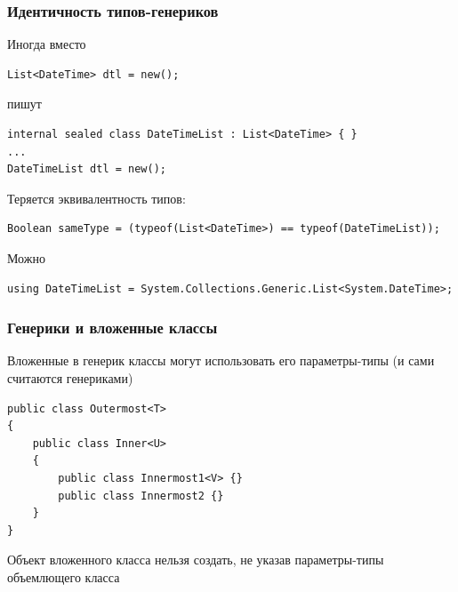 \documentclass{../../slides-style}
\begin{document}
    \begin{frame}[fragile]
        \frametitle{Идентичность типов-генериков}
        Иногда вместо
        \begin{footnotesize}
            \begin{verbatim}
List<DateTime> dtl = new();
            \end{verbatim}
        \end{footnotesize}
        пишут
        \begin{footnotesize}
            \begin{verbatim}
internal sealed class DateTimeList : List<DateTime> { }
...
DateTimeList dtl = new();
            \end{verbatim}
        \end{footnotesize}
        \vspace{5mm}
        Теряется эквивалентность типов:
        \begin{footnotesize}
            \begin{verbatim}
Boolean sameType = (typeof(List<DateTime>) == typeof(DateTimeList));
            \end{verbatim}
        \end{footnotesize}
        \vspace{5mm}
        Можно
        \begin{footnotesize}
            \begin{verbatim}
using DateTimeList = System.Collections.Generic.List<System.DateTime>;
            \end{verbatim}
        \end{footnotesize}
    \end{frame}

    \begin{frame}[fragile]
        \frametitle{Генерики и вложенные классы}
        Вложенные в генерик классы могут использовать его параметры-типы (и сами считаются генериками)
        \vspace{5mm}
        \begin{footnotesize}
            \begin{verbatim}
public class Outermost<T>
{
    public class Inner<U>
    {
        public class Innermost1<V> {}
        public class Innermost2 {}
    }
}
            \end{verbatim}
        \end{footnotesize}
        \vspace{5mm}
        Объект вложенного класса нельзя создать, не указав параметры-типы объемлющего класса
    \end{frame}
\end{document}
